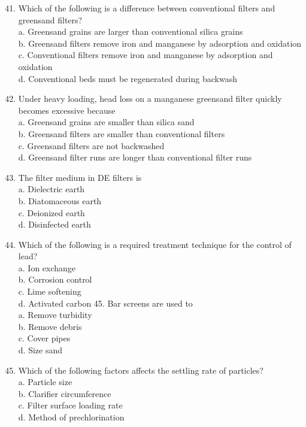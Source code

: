 \documentclass[10pt]{article}
\begin{document}
\begin{enumerate}
  \setcounter{enumi}{40}
  \item Which of the following is a difference between conventional filters and greensand filters?\\
a. Greensand grains are larger than conventional silica grains\\
b. Greensand filters remove iron and manganese by adsorption and oxidation\\
c. Conventional filters remove iron and manganese by adsorption and oxidation\\
d. Conventional beds must be regenerated during backwash

  \item Under heavy loading, head loss on a manganese greensand filter quickly becomes excessive because\\
a. Greensand grains are smaller than silica sand\\
b. Greensand filters are smaller than conventional filters\\
c. Greensand filters are not backwashed\\
d. Greensand filter runs are longer than conventional filter runs

  \item The filter medium in DE filters is\\
a. Dielectric earth\\
b. Diatomaceous earth\\
c. Deionized earth\\
d. Disinfected earth

  \item Which of the following is a required treatment technique for the control of lead?\\
a. Ion exchange\\
b. Corrosion control\\
c. Lime softening\\
d. Activated carbon 45. Bar screens are used to\\
a. Remove turbidity\\
b. Remove debris\\
c. Cover pipes\\
d. Size sand

  \item Which of the following factors affects the settling rate of particles?\\
a. Particle size\\
b. Clarifier circumference\\
c. Filter surface loading rate\\
d. Method of prechlorination


\end{enumerate}
\end{document}
